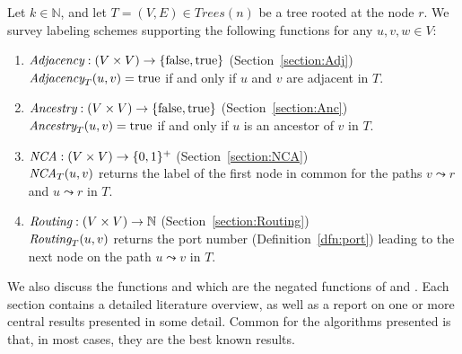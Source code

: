 Let $k \in \mathbb{N}$, and let $T=(V,E)  \in Trees(n)$  be a tree rooted at the node $r$.
We survey labeling  schemes supporting  the following functions for any  $u,v,w \in V$:
	\begin{enumerate}
	  \setlength{\itemsep}{2pt}
	\item $\emph{Adjacency}:(V \times V) \rightarrow \{ \mathrm{false}, \mathrm{true}\}$ (Section~\ref{section:Adj})  			 \\ $\emph{Adjacency}_T(u,v) =  \mathrm{true}$ if and only if $u$ and $v$ are adjacent in $T$. 
	\item $\emph{Ancestry}: (V \times V) \rightarrow \{ \mathrm{false}, \mathrm{true}\}$    (Section~\ref{section:Anc})  		  \\ $\emph{Ancestry}_T(u,v) =  \mathrm{true}$ if and only if $u$ is an ancestor of $v$ in $T$.
	\item $\emph{NCA}: (V \times V) \rightarrow \{ 0,1 \}^+$       (Section~\ref{section:NCA})  			\\  $\emph{NCA}_T(u,v)$ returns the label of the first node in common for the paths  $v \leadsto r $ and $u \leadsto r$ in $T$.  
	\item $\emph{Routing}: (V \times V) \rightarrow  \mathbb{N} $        (Section~\ref{section:Routing})  					\\  $\emph{Routing}_T(u,v)$ returns the port number (Definition~\ref{dfn:port}) leading to the next node on the  path  $u \leadsto v$ in $T$.
	\end{enumerate}
We also discuss the functions \nonadjacency and \nonancestry which are the negated functions of \adjacency and \ancestry. Each section contains a detailed literature overview,  as well as a report on one or more central results presented in some detail. Common for the algorithms presented is that, in most cases, they are  the best known results.

